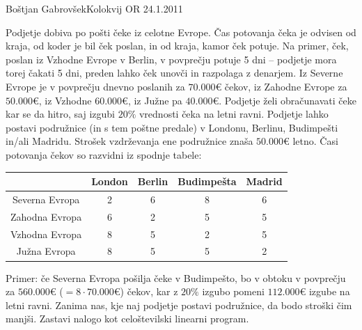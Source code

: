 \begin{naloga}{Boštjan Gabrovšek}{Kolokvij OR 24.1.2011}
\begin{vprasanje}[ceki]
Podjetje dobiva po pošti čeke iz celotne Evrope.
Čas potovanja čeka je odvisen od kraja, od koder je bil ček poslan,
in od kraja, kamor ček potuje.
Na primer, ček, poslan iz Vzhodne Evrope v Berlin, v povprečju potuje 5 dni
-- podjetje mora torej čakati 5 dni,
preden lahko ček unovči in razpolaga z denarjem.
Iz Severne Evrope je v povprečju dnevno poslanih za $70.000 €$ čekov,
iz Zahodne Evrope za $50.000 €$, iz Vzhodne $60.000 €$,
iz Južne pa $40.000 €$.
Podjetje želi obračunavati čeke kar se da hitro,
saj izgubi $20\%$ vrednosti čeka na letni ravni.
Podjetje lahko postavi podružnice (in s tem poštne predale)
v Londonu, Berlinu, Budimpešti in/ali Madridu.
Strošek vzdrževanja ene podružnice znaša $50.000 €$ letno.
Časi potovanja čekov so razvidni iz spodnje tabele:
\begin{center}
\begin{tabular}{c|cccc}
& London & Berlin & Budimpešta & Madrid \\ \hline
Severna Evropa & 2 & 6 & 8 & 6 \\
Zahodna Evropa & 6 & 2 & 5 & 5 \\
Vzhodna Evropa & 8 & 5 & 2 & 5 \\
Južna Evropa   & 8 & 5 & 5 & 2
\end{tabular}
\end{center}
Primer: če Severna Evropa pošilja čeke v Budimpešto,
bo v obtoku v pov\-preč\-ju za $560.000 €$ ($= 8 \cdot 70.000 €$) čekov,
kar z $20\%$ izgubo pomeni $112.000 €$ izgube na letni ravni.
Zanima nas, kje naj podjetje postavi podružnice, da bodo stroški čim manjši.
Zastavi nalogo kot celoštevilski linearni program.
\end{vprasanje}
\begin{odgovor}
\end{odgovor}
\end{naloga}


